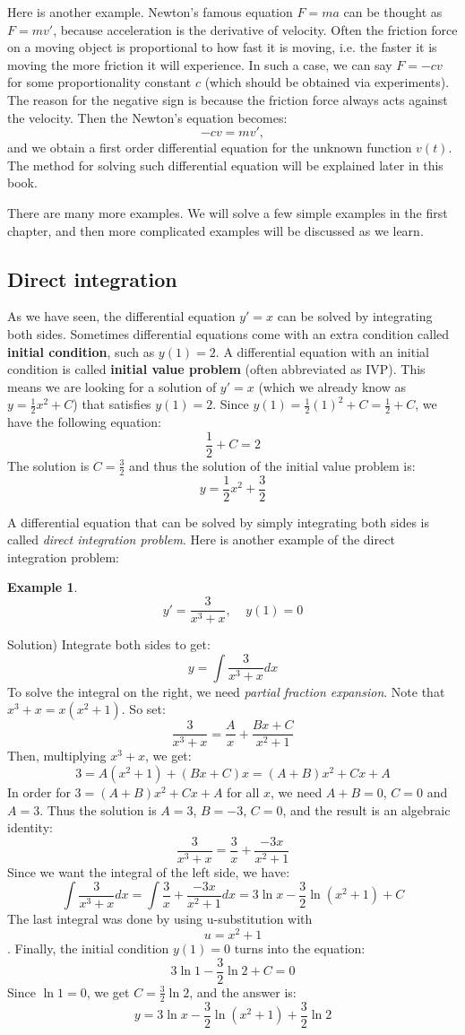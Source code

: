 \documentclass[12pt]{report}
\newtheorem{ex}{Example}[section]
\begin{document}
Here is another example. Newton's famous equation $F=ma$ can be thought as $F=m v'$, because acceleration is the derivative of velocity. Often the friction force on a moving object is proportional to how fast it is moving, i.e. the faster it is moving the more friction it will experience. In such a case, we can say $F= -cv$ for some proportionality constant $c$ (which should be obtained via experiments). The reason for the negative sign is because the friction force always acts against the velocity. Then the Newton's equation becomes:
$$-cv=mv',$$
and we obtain a first order differential equation for the unknown function $v(t)$. The method for solving such differential equation will be explained later in this book. 

There are many more examples. We will solve a few simple examples in the first chapter, and then more complicated examples will be discussed as we learn. 

\subsection*{Direct integration} 
As we have seen, the differential equation $y'= x$ can be solved by integrating both sides. Sometimes differential equations come with an extra condition called \textbf{initial condition}, such as $y(1)=2$.  A differential equation with an initial condition is called \textbf{initial value problem} (often abbreviated as IVP). This means we are looking for a solution of $y'=x$ (which we already know as $y = \frac{1}{2} x^2 +C $) that satisfies $y(1)=2$. Since $y(1)=\frac{1}{2}(1)^2+C=\frac{1}{2}+C$, we have the following equation:
$$\frac{1}{2}+C=2$$
The solution is $C=\frac{3}{2}$ and thus the solution of the initial value problem is:
$$y= \frac{1}{2} x^2 + \frac{3}{2} $$

A differential equation that can be solved by simply integrating both sides is called \textit{direct integration problem}. Here is another example of the direct integration problem:
\begin{ex} $$y'= \frac{3}{x^3+x}, \;\;\;\; y(1)=0$$
	\end{ex}
Solution)
Integrate both sides to get:
$$y= \int \frac{3}{x^3+x} dx $$
To solve the integral on the right, we need \textit{partial fraction expansion}. Note that $x^3+x=x(x^2+1)$. So set:
$$\frac{3}{x^3+x} = \frac{A}{x}+\frac{Bx+C}{x^2+1}$$
Then, multiplying $x^3+x$, we get:
$$3= A(x^2+1)+(Bx+C)x=(A+B)x^2+Cx+A$$
In order for $3=(A+B)x^2+Cx+A$ for all $x$, we need $A+B=0$, $C=0$ and $A=3$. Thus the solution is $A=3$, $B=-3$, $C=0$, and the result is an algebraic identity:
$$\frac{3}{x^3+x} = \frac{3}{x}+\frac{-3x}{x^2+1}$$
Since we want the integral of the left side, we have:
$$\int \frac{3}{x^3+x} dx =\int \frac{3}{x}+\frac{-3x}{x^2+1} dx = 3 \ln x -\frac{3}{2} \ln {(x^2+1)} +C $$
The last integral was done by using u-substitution with $$u=x^2+1$$.
Finally, the initial condition $ y(1)=0$ turns into the equation:
$$3 \ln 1 -\frac{3}{2} \ln 2 +C = 0$$
Since $\ln 1=0$, we get $C= \frac{3}{2} \ln 2$, and the answer is:
$$y = 3 \ln x -\frac{3}{2} \ln {(x^2+1)} + \frac{3}{2} \ln 2$$ 
\end{document}
